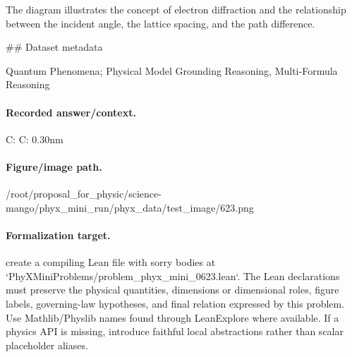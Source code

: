 The diagram illustrates the concept of electron diffraction and the relationship between the incident angle, the lattice spacing, and the path difference.

\#\# Dataset metadata

Quantum Phenomena; Physical Model Grounding Reasoning, Multi-Formula Reasoning

\paragraph{Recorded answer/context.}
C: C: 0.30nm

\paragraph{Figure/image path.}
/root/proposal\_for\_physic/science-mango/phyx\_mini\_run/phyx\_data/test\_image/623.png

\paragraph{Formalization target.}
create a compiling Lean file with sorry bodies at `PhyXMiniProblems/problem\_phyx\_mini\_0623.lean`. The Lean declarations must preserve the physical quantities, dimensions or dimensional roles, figure labels, governing-law hypotheses, and final relation expressed by this problem.
Use Mathlib/Physlib names found through LeanExplore where available. If a physics API is missing, introduce faithful local abstractions rather than scalar placeholder aliases.

